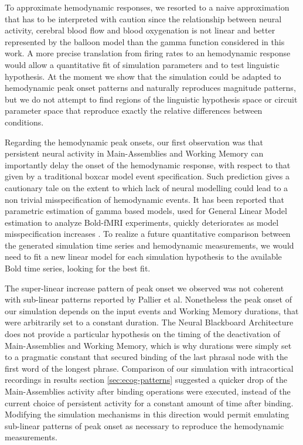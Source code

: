 \documentclass[10pt]{article}
\begin{document}
To approximate hemodynamic responses, we resorted to a naive approximation that has to be interpreted with caution since the relationship between neural activity, cerebral blood flow and blood oxygenation is not linear\cite{Friston_2000,Buxton_2004} and better represented by the balloon model than the gamma function considered in this work\cite{Waldorp_2009}.
A more precise translation from firing rates to an hemodynamic response would allow a quantitative fit of simulation parameters and to test linguistic hypothesis.
At the moment we show that the simulation could be adapted to hemodynamic peak onset patterns and naturally reproduces magnitude patterns, but we do not attempt to find regions of the linguistic hypothesis space or circuit parameter space that reproduce exactly the relative differences between conditions.

Regarding the hemodynamic peak onsets, our first observation was that persistent neural activity in Main-Assemblies and Working Memory can importantly delay the onset of the hemodynamic response, with respect to that given by a traditional boxcar model event specification.
Such prediction gives a cautionary tale on the extent to which lack of neural modelling could lead to a non trivial misspecification of hemodynamic events.
It has been reported that parametric estimation of gamma based models, used for General Linear Model estimation to analyze Bold-fMRI experiments, quickly deteriorates as model misspecification increases \cite{lindquist2009modeling}.
To realize a future quantitative comparison between the generated simulation time series and hemodynamic measurements, we would need to fit a new linear model for each simulation hypothesis to the available Bold time series, looking for the best fit.

The super-linear increase pattern of peak onset we observed was not coherent with sub-linear patterns reported by Pallier et al.
Nonetheless the peak onset of our simulation depends on the input events and Working Memory durations, that were arbitrarily set to a constant duration.
The Neural Blackboard Architecture does not provide a particular hypothesis on the timing of the deactivation of Main-Assemblies and Working Memory, which is why durations were simply set to a pragmatic constant that secured binding of the last phrasal node with the first word of the longest phrase.
Comparison of our simulation with intracortical recordings in results section \ref{sec:ecog-patterns} suggested a quicker drop of the Main-Assemblies activity after binding operations were executed, instead of the current choice of persistent activity for a constant amount of time after binding.
Modifying the simulation mechanisms in this direction would permit emulating sub-linear patterns of peak onset as necessary to reproduce the hemodynamic measurements.
\end{document}
